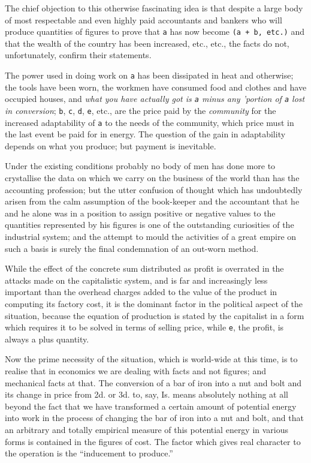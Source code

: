 \documentclass{book}
\newcommand\mdcode[1]{\texttt{#1}}
\begin{document}
The chief objection to this otherwise fascinating idea is that despite a large body of most respectable and even highly paid accountants and bankers who will produce quantities of figures to prove that \mdcode{a} has now become \mdcode{(\allowbreak{}a + b, etc.\allowbreak{})\allowbreak{}} and that the wealth of the country has been increased, etc., etc., the facts do not, unfortunately, confirm their statements.

The power used in doing work on \mdcode{a} has been dissipated in heat and otherwise; the tools have been worn, the workmen have consumed food and clothes and have occupied houses, and \emph{what you have actually got is \mdcode{a} minus any ’portion of \mdcode{a} lost in conversion}; \mdcode{b}, \mdcode{c}, \mdcode{d}, \mdcode{e}, etc., are the price paid by the \emph{community} for the increased adaptability of \mdcode{a} to the needs of the community, which price must in the last event be paid for in energy. The question of the gain in adaptability depends on what you produce; but payment is inevitable.

Under the existing conditions probably no body of men has done more to crystallise the data on which we carry on the business of the world than has the accounting profession; but the utter confusion of thought which has undoubtedly arisen from the calm assumption of the book-keeper and the accountant that he and he alone was in a position to assign positive or negative values to the quantities represented by his figures is one of the outstanding curiosities of the industrial system; and the attempt to mould the activities of a great empire on such a basis is surely the final condemnation of an out-worn method.

While the effect of the concrete sum distributed as profit is overrated in the attacks made on the capitalistic system, and is far and increasingly less important than the overhead charges added to the value of the product in computing its factory cost, it is the dominant factor in the political aspect of the situation, because the equation of production is stated by the capitalist in a form which requires it to be solved in terms of selling price, while \mdcode{e}, the profit, is always a plus quantity.

Now the prime necessity of the situation, which is world-wide at this time, is to realise that in economics we are dealing with facts and not figures; and mechanical facts at that. The conversion of a bar of iron into a nut and bolt and its change in price from 2d. or 3d. to, say, Is. means absolutely nothing at all beyond the fact that we have transformed a certain amount of potential energy into work in the process of changing the bar of iron into a nut and bolt, and that an arbitrary and totally empirical measure of this potential energy in various forms is contained in the figures of cost. The factor which gives real character to the operation is the “inducement to produce.”
\end{document}

